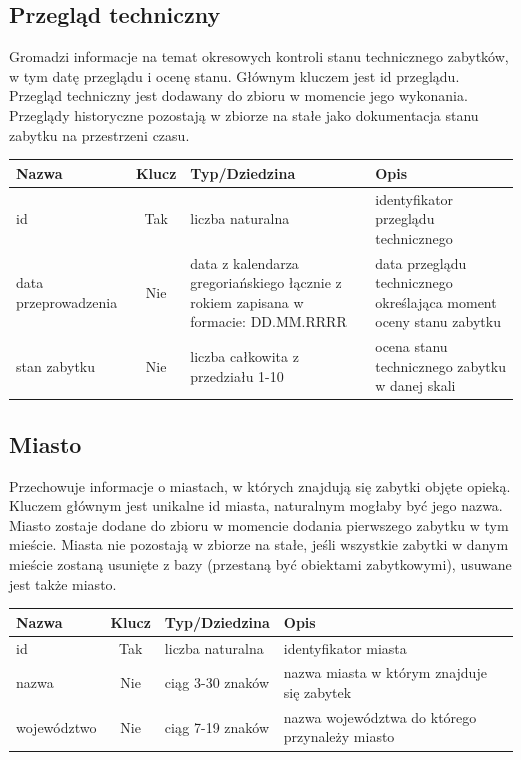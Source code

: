 \documentclass{article}
\begin{document}
\subsection*{Przegląd techniczny}
Gromadzi informacje na temat okresowych kontroli stanu technicznego zabytków, w tym datę przeglądu i ocenę stanu. Głównym kluczem jest id przeglądu. Przegląd techniczny jest dodawany do zbioru w momencie jego wykonania. Przeglądy historyczne pozostają w zbiorze na stałe jako dokumentacja stanu zabytku na przestrzeni czasu.  
\begin{longtable}{|C{3cm}|c|C{4.5cm}|C{5cm}|}
\hline
\textbf{Nazwa} & \textbf{Klucz} & \textbf{Typ/Dziedzina} & \textbf{Opis} \\ \hline
id & Tak & liczba naturalna & identyfikator przeglądu technicznego \\ \hline 
data przeprowadzenia & Nie & data z kalendarza gregoriańskiego łącznie z rokiem zapisana w formacie: DD.MM.RRRR  & data przeglądu technicznego określająca moment oceny stanu zabytku  \\ \hline
stan zabytku & Nie & liczba całkowita z przedziału 1-10 & ocena stanu technicznego zabytku w danej skali  \\ \hline
\end{longtable}

\subsection*{Miasto}
Przechowuje informacje o miastach, w których znajdują się zabytki objęte opieką. Kluczem głównym jest unikalne id miasta, naturalnym mogłaby być jego nazwa. Miasto zostaje dodane do zbioru w momencie dodania pierwszego zabytku w tym mieście. Miasta nie pozostają w zbiorze na stałe, jeśli wszystkie zabytki w danym mieście zostaną usunięte z bazy (przestaną być obiektami zabytkowymi), usuwane jest także miasto.  
\begin{longtable}{|C{3cm}|c|C{4.5cm}|C{5cm}|}
\hline
\textbf{Nazwa} & \textbf{Klucz} & \textbf{Typ/Dziedzina} & \textbf{Opis} \\ \hline
id & Tak & liczba naturalna & identyfikator miasta \\ \hline 
nazwa & Nie & ciąg 3-30 znaków & nazwa miasta w którym znajduje się zabytek \\ \hline
województwo & Nie & ciąg 7-19 znaków & nazwa województwa do którego przynależy miasto \\ \hline
\end{longtable}
\end{document}
